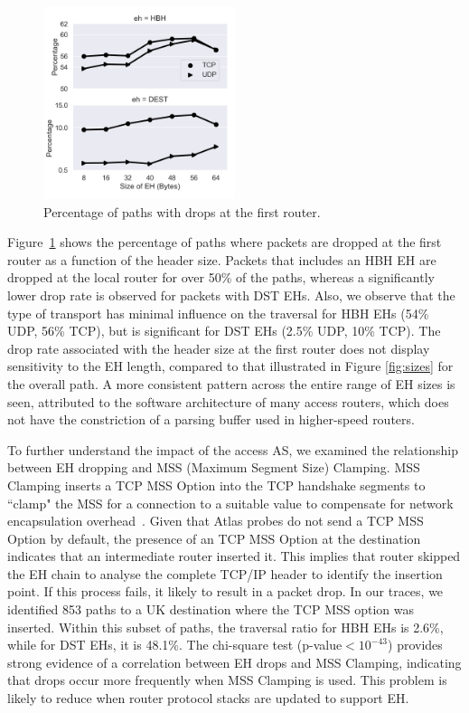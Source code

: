 \documentclass[conference]{IEEEtran}
\begin{document}
\begin{figure}[t]
\centering
  \includegraphics[width=0.5\textwidth]{empty_paths.png}
  \caption{Percentage of paths with drops at the first router.}
  \label{fig:empty_paths}
\end{figure}

Figure~\ref{fig:empty_paths} shows the percentage of
paths where packets are dropped at the first router as a function of the
header size.  
Packets that includes an HBH EH are dropped at the local router for over 50\% of
the paths, whereas a significantly lower drop rate is observed for packets with
DST EHs.  Also, we observe that the type of transport has minimal influence on
the traversal for HBH EHs (54\% UDP, 56\% TCP), but is significant for DST EHs
(2.5\% UDP, 10\% TCP).
The drop rate associated with the header size at the first
router does not display sensitivity to the EH length, compared to that
illustrated in Figure \ref{fig:sizes} for the overall path. A more consistent pattern
 across the entire range of EH sizes is seen,  attributed to the software architecture of
many access routers, which does not have the constriction of a parsing buffer
used in higher-speed routers.

To further understand the impact of the access AS, we examined the
relationship between EH dropping and MSS (Maximum Segment Size) Clamping.
MSS Clamping inserts a TCP MSS Option into the TCP handshake segments
to ``clamp" the MSS for a connection to a suitable value to compensate for
network encapsulation overhead~\cite{custura-mtu}.  
Given that Atlas probes do not send a TCP MSS Option by default, the
presence of an TCP MSS Option at the destination indicates that an intermediate
router inserted it. This implies that router skipped the EH chain to analyse
the complete TCP/IP header to identify the insertion point. If this process
fails, it likely to result in a packet drop.
In our traces, we identified 853 paths to a UK destination where the TCP
MSS option was inserted. Within
this subset of paths, the traversal ratio for HBH EHs is 2.6\%, while for
DST EHs, it is 48.1\%. The chi-square test (p-value$<10^{-43}$) provides
strong evidence of a correlation between EH drops and MSS Clamping, indicating
that drops occur more frequently when MSS Clamping is used. This
problem is likely to reduce when router protocol stacks are updated to support EH. 
\end{document}
